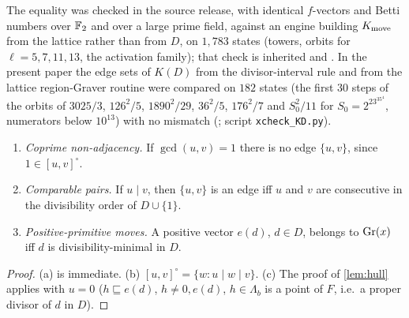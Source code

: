\begin{remark}
The equality was checked in the source release, with identical $f$-vectors and Betti numbers over $\mathbb F_2$ and over a large prime field, against an engine building $K_{\mathrm{move}}$ from the lattice rather than from $D$, on $1{,}783$ states (towers, orbits for $\ell=5,7,11,13$, the activation family); that check is inherited and . In the present paper the edge sets of $K(D)$ from the divisor-interval rule and from the lattice region-Graver routine were compared on $182$ states (the first $30$ steps of the orbits of $3025/3$, $126^2/5$, $1890^2/29$, $36^2/5$, $176^2/7$ and $S_0^2/11$ for $S_0=2^23^35^4$, numerators below $10^{13}$) with no mismatch (; script \texttt{xcheck\_KD.py}).
\end{remark}
\begin{corollary}\label{cor:local}
\begin{enumerate}[label=(\alph*),itemsep=1pt]
\item \emph{Coprime non-adjacency.} If $\gcd(u,v)=1$ there is no edge $\{u,v\}$, since $1\in[u,v]^\circ$.
\item \emph{Comparable pairs.} If $u\mid v$, then $\{u,v\}$ is an edge iff $u$ and $v$ are consecutive in the divisibility order of $D\cup\{1\}$.
\item \emph{Positive-primitive moves.} A positive vector $e(d)$, $d\in D$, belongs to $\mathrm{Gr}(x)$ iff $d$ is divisibility-minimal in $D$.
\end{enumerate}
\end{corollary}
\begin{proof}
(a) is immediate. (b) $[u,v]^\circ=\{w:u\mid w\mid v\}$. (c) The proof of \cref{lem:hull} applies with $u=0$ ($h\sqsubseteq e(d)$, $h\ne0,e(d)$, $h\in\Lambda_b$ is a point of $F$, i.e.\ a proper divisor of $d$ in $D$). \qedhere
\end{proof}

